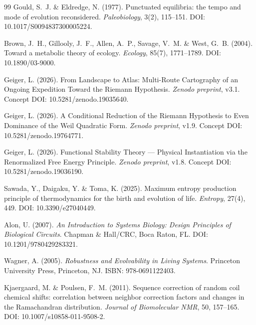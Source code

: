 \documentclass[12pt,a4paper]{article}
\theoremstyle{remark}
\begin{document}
\begin{thebibliography}{99}
Gould, S.~J. \& Eldredge, N. (1977).
\newblock Punctuated equilibria: the tempo and mode of evolution reconsidered.
\newblock \textit{Paleobiology}, 3(2), 115--151.
\newblock DOI: 10.1017/S0094837300005224.

Brown, J.~H., Gillooly, J.~F., Allen, A.~P., Savage, V.~M. \& West, G.~B. (2004).
\newblock Toward a metabolic theory of ecology.
\newblock \textit{Ecology}, 85(7), 1771--1789.
\newblock DOI: 10.1890/03-9000.

Geiger, L. (2026).
\newblock From Landscape to Atlas: Multi-Route Cartography of an Ongoing Expedition Toward the Riemann Hypothesis.
\newblock \textit{Zenodo preprint}, v3.1.
\newblock Concept DOI: 10.5281/zenodo.19035640.

Geiger, L. (2026).
\newblock A Conditional Reduction of the Riemann Hypothesis to Even Dominance of the Weil Quadratic Form.
\newblock \textit{Zenodo preprint}, v1.9.
\newblock Concept DOI: 10.5281/zenodo.19764771.

Geiger, L. (2026).
\newblock Functional Stability Theory --- Physical Instantiation via the Renormalized Free Energy Principle.
\newblock \textit{Zenodo preprint}, v1.8.
\newblock Concept DOI: 10.5281/zenodo.19036190.

Sawada, Y., Daigaku, Y. \& Toma, K. (2025).
\newblock Maximum entropy production principle of thermodynamics for the birth and evolution of life.
\newblock \textit{Entropy}, 27(4), 449.
\newblock DOI: 10.3390/e27040449.

Alon, U. (2007).
\newblock \textit{An Introduction to Systems Biology: Design Principles of Biological Circuits}.
\newblock Chapman \& Hall/CRC, Boca Raton, FL.
\newblock DOI: 10.1201/9780429283321.

Wagner, A. (2005).
\newblock \textit{Robustness and Evolvability in Living Systems}.
\newblock Princeton University Press, Princeton, NJ. ISBN: 978-0691122403.

Kjaergaard, M. \& Poulsen, F.~M. (2011).
\newblock Sequence correction of random coil chemical shifts: correlation between neighbor correction factors and changes in the Ramachandran distribution.
\newblock \textit{Journal of Biomolecular NMR}, 50, 157--165.
\newblock DOI: 10.1007/s10858-011-9508-2.


\end{thebibliography}
\end{document}
